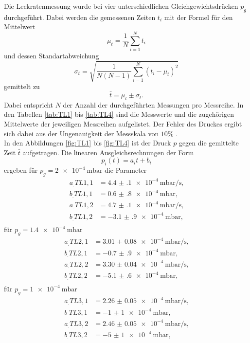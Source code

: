 Die Leckratenmessung wurde bei vier unterschiedlichen Gleichgewichtsdrücken $p_g$ durchgeführt. Dabei werden die gemessenen Zeiten $t_i$ mit der Formel für den Mittelwert
\[
\mu_t = \frac{1}{N}\sum_{i=1}^{N}t_i
\]
und dessen Standartabweichung
\[
\sigma_t = \sqrt{\frac{1}{N(N-1)}\sum_{i=1}^{N}(t_i-\mu_t)^2}
\]
gemittelt zu
\begin{equation}
\bar{t} = \mu_t\pm \sigma_t\text{.} \label{eq:tQuer}
\end{equation} 
Dabei entspricht $N$ der Anzahl der durchgeführten Messungen pro Messreihe.
In den Tabellen \ref{tab:TL1} bis \ref{tab:TL4} sind die Messwerte und die zugehörigen Mittelwerte der jeweiligen Messreihen aufgelistet. Der Fehler des Druckes ergibt sich dabei aus der Ungenauigkeit der Messskala von $10\%$ \cite{V70}.\\
In den Abbildungen \ref{fig:TL1} bis \ref{fig:TL4} ist der Druck $p$ gegen die gemittelte Zeit $\bar{t}$ aufgetragen.
Die linearen Ausgleichsrechnungen der Form
\[
p_i(t) = a_it+b_i
\]
ergeben für $p_g = \SI{2e-4}{\milli\bar}$ die Parameter
\begin{align*}
a_.{TL1,1} &= \SI{4.4(1)e-4}{\milli\bar\per\second} \text{,}\\
b_.{TL1,1} &= \SI{0.6(8)e-4}{\milli\bar} \text{,}\\
a_.{TL1,2} &= \SI{4.7(1)e-4}{\milli\bar\per\second} \text{,}\\
b_.{TL1,2} &= \SI{-3.1(9)e-4}{\milli\bar} \text{,}\\
\end{align*}
für $p_g = \SI{1.4e-4}{\milli\bar}$
\begin{align*}
a_.{TL2,1} &= \SI{3.01(8)e-4}{\milli\bar\per\second} \text{,}\\
b_.{TL2,1} &= \SI{-0.7(9)e-4}{\milli\bar} \text{,}\\
a_.{TL2,2} &= \SI{3.30(4)e-4}{\milli\bar\per\second} \text{,}\\
b_.{TL2,2} &= \SI{-5.1(6)e-4}{\milli\bar} \text{,}\\
\end{align*}
für $p_g = \SI{1e-4}{\milli\bar}$
\begin{align*}
a_.{TL3,1} &= \SI{2.26(5)e-4}{\milli\bar\per\second} \text{,}\\
b_.{TL3,1} &= \SI{-1(1)e-4}{\milli\bar} \text{,}\\
a_.{TL3,2} &= \SI{2.46(5)e-4}{\milli\bar\per\second} \text{,}\\
b_.{TL3,2} &= \SI{-5(1)e-4}{\milli\bar} \text{,}\\
\end{align*}
